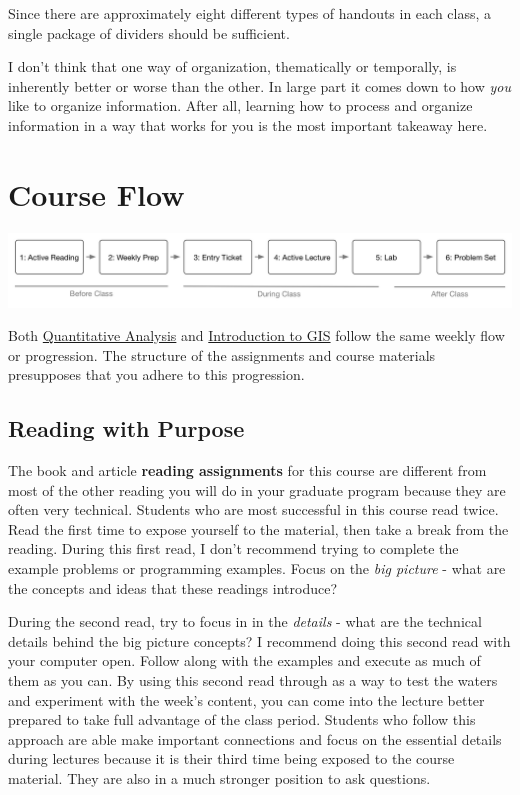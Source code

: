 \documentclass[]{book}
\theoremstyle{definition}
\theoremstyle{definition}
\theoremstyle{definition}
\theoremstyle{remark}
\begin{document}
Since there are approximately eight different types of handouts in each
class, a single package of dividers should be sufficient.

I don't think that one way of organization, thematically or temporally,
is inherently better or worse than the other. In large part it comes
down to how \emph{you} like to organize information. After all, learning
how to process and organize information in a way that works for you is
the most important takeaway here.

\section{Course Flow}\label{course-flow}

\begin{center}\includegraphics[width=1\linewidth]{images/courseWorkflow} \end{center}

Both \href{https://slu-soc5050.github.io}{Quantitative Analysis} and
\href{https://slu-soc5650.github.io}{Introduction to GIS} follow the
same weekly flow or progression. The structure of the assignments and
course materials presupposes that you adhere to this progression.

\subsection{Reading with Purpose}\label{reading-with-purpose}

The book and article \textbf{reading assignments} for this course are
different from most of the other reading you will do in your graduate
program because they are often very technical. Students who are most
successful in this course read twice. Read the first time to expose
yourself to the material, then take a break from the reading. During
this first read, I don't recommend trying to complete the example
problems or programming examples. Focus on the \emph{big picture} - what
are the concepts and ideas that these readings introduce?

During the second read, try to focus in in the \emph{details} - what are
the technical details behind the big picture concepts? I recommend doing
this second read with your computer open. Follow along with the examples
and execute as much of them as you can. By using this second read
through as a way to test the waters and experiment with the week's
content, you can come into the lecture better prepared to take full
advantage of the class period. Students who follow this approach are
able make important connections and focus on the essential details
during lectures because it is their third time being exposed to the
course material. They are also in a much stronger position to ask
questions.
\end{document}

